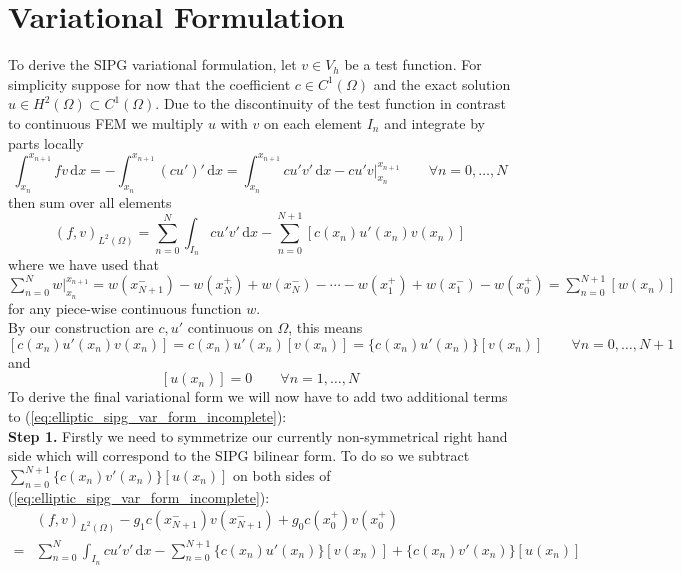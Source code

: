 \section{Variational Formulation}
To derive the SIPG variational formulation, let $v \in V_h$ be a test
function. For simplicity suppose for now that the coefficient $c \in C^1(\Omega)$ and
the exact solution $u \in H^2(\Omega) \subset C^1(\Omega)$. 
Due to the discontinuity of the test function in contrast to 
continuous FEM we multiply $u$ with $v$ on each element $I_n$
and integrate by parts locally
\begin{equation*}
    \int_{x_n}^{x_{n+1}} fv\, \text{d}x = -\int_{x_n}^{x_{n+1}} (cu')'\, \text{d}x 
    = \int_{x_n}^{x_{n+1}} cu'v'\, \text{d}x 
    -  cu'v\Big|_{x_n}^{x_{n+1}} \qquad \forall n=0,\ldots,N
\end{equation*}
then sum over all elements
\begin{equation}
    \label{eq:elliptic_sipg_var_form_incomplete}
    (f,v)_{L^2(\Omega)} = \sum_{n=0}^N \int_{I_n} cu'v'\, \text{d}x 
    -\sum_{n=0}^{N+1} [c(x_n)u'(x_n)v(x_n)]
\end{equation}
where we have used that $\sum_{n=0}^N  w \Big|_{x_n}^{x_{n+1}} = w(x_{N+1}^-) - 
w(x_{N}^+) + w(x_{N}^-) - \cdots - w(x_1^+) + w(x_1^-) - w(x_0^+) = \sum_{n=0}^{N+1} [w(x_n)]$ for any piece-wise continuous function $w$.
\\
By our construction are $c, u'$ continuous on $\Omega$, this means 
\begin{equation}
    \label{eq:id_1_cu_jump_zero}
        [c(x_n)u'(x_n)v(x_n)] = c(x_n)u'(x_n)[v(x_n)] = \{c(x_n)u'(x_n)\}[v(x_n)] \qquad \forall n=0,\ldots,N+1
\end{equation}
and 
\begin{equation}
    \label{eq:id_2_u_jump_zero}
    [u(x_n)] = 0 \qquad \forall n=1,\ldots,N
\end{equation}
To derive the final variational form we will now have to add two additional terms
to (\ref{eq:elliptic_sipg_var_form_incomplete}): \\
\textbf{Step 1.} Firstly we need to symmetrize our currently non-symmetrical right hand side
which will correspond to the SIPG bilinear form. To do so
we subtract $\sum_{n=0}^{N+1} \{c(x_n)v'(x_n)\}[u(x_n)]$ on both sides of
(\ref{eq:elliptic_sipg_var_form_incomplete}):
\begin{align*}
    &(f,v)_{L^2(\Omega)}-g_1c(x_{N+1}^-)v(x_{N+1}^-) + g_0c(x_0^+)v(x_0^+) \\
    = &\sum_{n=0}^N \int_{I_n} cu'v'\, \text{d}x 
    -\sum_{n=0}^{N+1} \{c(x_n)u'(x_n)\}[v(x_n)] + \{c(x_n)v'(x_n)\}[u(x_n)]
\end{align*}
